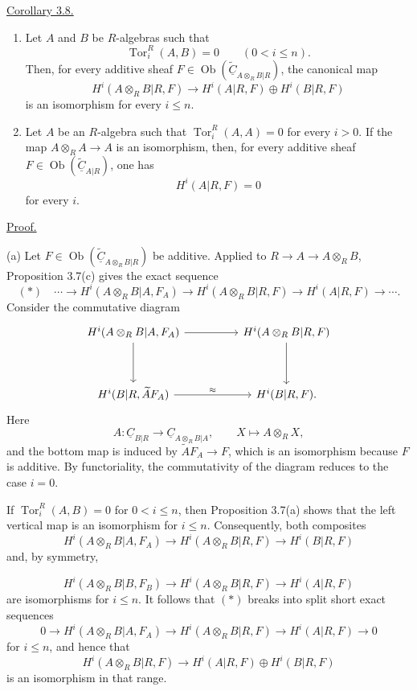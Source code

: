 
\underline{Corollary 3.8.}

\begin{enumerate}[label=(\alph*)]
\item Let $A$ and $B$ be $R$-algebras such that
\[
 \operatorname{Tor}_i^R(A,B)=0\qquad(0<i\leq n).
\]
Then, for every additive sheaf
$F\in\operatorname{Ob}(\widetilde{\underline C}_{A\otimes_RB|R})$,
the canonical map
\[
 H^i(A\otimes_RB|R,F)
 \longrightarrow H^i(A|R,F)\oplus H^i(B|R,F)
\]
is an isomorphism for every $i\leq n$.

\item Let $A$ be an $R$-algebra such that
$\operatorname{Tor}_i^R(A,A)=0$ for every $i>0$. If the map
$A\otimes_RA\longrightarrow A$ is an isomorphism, then, for every
additive sheaf
$F\in\operatorname{Ob}(\widetilde{\underline C}_{A|R})$, one has
\[
 H^i(A|R,F)=0
\]
for every $i$.
\end{enumerate}

\underline{Proof.}

(a) Let
$F\in\operatorname{Ob}(\widetilde{\underline C}_{A\otimes_RB|R})$
be additive. Applied to
$R\longrightarrow A\longrightarrow A\otimes_RB$, Proposition
3.7(c) gives the exact sequence
\[
 (*)\quad\cdots\longrightarrow
 H^i(A\otimes_RB|A,F_A)
 \longrightarrow H^i(A\otimes_RB|R,F)
 \longrightarrow H^i(A|R,F)\longrightarrow\cdots.
\]
Consider the commutative diagram
\[
\begin{tikzcd}[column sep=huge,row sep=huge]
H^i(A\otimes_RB|A,F_A) \arrow[r] \arrow[d]
& H^i(A\otimes_RB|R,F) \arrow[d]\\
H^i(B|R,\widetilde A F_A) \arrow[r,"\approx"]
& H^i(B|R,F).
\end{tikzcd}
\]
Here
\[
 A:\underline C_{B|R}\longrightarrow
 \underline C_{A\otimes_RB|A},
 \qquad X\longmapsto A\otimes_RX,
\]
and the bottom map is induced by
$\widetilde A F_A\longrightarrow F$, which is an isomorphism
because $F$ is additive. By functoriality, the commutativity of the
diagram reduces to the case $i=0$.

If $\operatorname{Tor}_i^R(A,B)=0$ for $0<i\leq n$, then
Proposition 3.7(a) shows that the left vertical map is an
isomorphism for $i\leq n$. Consequently, both composites
\[
 H^i(A\otimes_RB|A,F_A)
 \longrightarrow H^i(A\otimes_RB|R,F)
 \longrightarrow H^i(B|R,F)
\]
and, by symmetry,


\[
 H^i(A\otimes_RB|B,F_B)
 \longrightarrow H^i(A\otimes_RB|R,F)
 \longrightarrow H^i(A|R,F)
\]
are isomorphisms for $i\leq n$. It follows that $(*)$ breaks into
split short exact sequences
\[
 0\longrightarrow H^i(A\otimes_RB|A,F_A)
 \longrightarrow H^i(A\otimes_RB|R,F)
 \longrightarrow H^i(A|R,F)\longrightarrow0
\]
for $i\leq n$, and hence that
\[
 H^i(A\otimes_RB|R,F)
 \longrightarrow H^i(A|R,F)\oplus H^i(B|R,F)
\]
is an isomorphism in that range.

